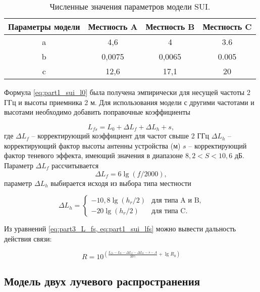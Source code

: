 \begin{longtable}[c]{| c | c | c | c |}
  \caption{Численные значения параметров модели SUI.}\label{tab:part1_abc_sui_model}\\

  \hline
  \textbf{Параметры модели} & \textbf{Местность A} & \textbf{Местность B} &  \textbf{Местность C}\\ \hline
  a & 4,6 & 4 & 3.6 \\
  b & 0,0075 & 0,0065 & 0.005 \\
  c & 12,6 & 17,1 &20 \\
  \hline
  \hline
\end{longtable}





Формула \cref{eq:part1_sui_l0} была получена эмпирически для несущей частоты 2 ГГц и высоты приемника 2 м. Для использования модели с другими частотами и высотами необходимо добавить поправочные коэффициенты 

\begin{equation}
  \label{eq:part1_sui_lfs}
  L_{fs} = L_0 + \Delta L_f + \Delta L_h + s,
\end{equation}
где $\Delta L_f$ -- корректирующий коэффициент для частот свыше 2 ГГц $\Delta L_h$ --  корректирующий фактор высоты антенны устройства (м) $s$ -- корректирующий фактор теневого эффекта, имеющий значения в диапазоне $8,2 < S < 10,6$ дБ. Параметр $\Delta L_f$ рассчитывается 
$$
\Delta L_f  = 6 \lg{(f / 2000)},
$$
параметр $\Delta L_h$ выбирается исходя из выбора типа местности

$$
\Delta L_h =  
 \begin{cases}
  -10,8 \lg{(h_r/2)} &\text{для типа A и B,}\\
  -20 \lg{(h_r/2)} &\text{для типа C.}
 \end{cases}
$$

Из уравнений \cref{eq:part3_L_fs, eq:part1_sui_lfs} можно вывести дальность действия связи:

\begin{equation}
  \label{eq:part1_sui_model_r}
  R = 10^{(\frac{L_{fs} - L_0 - \Delta L_f - \Delta L_h - s - A}{10\gamma} + \lg{R_0})}
\end{equation}

\subsection{Модель двух лучевого распространения}

